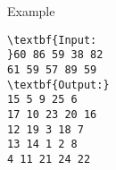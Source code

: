 Example
\begin{verbatim}
\textbf{Input:
}60 86 59 38 82 
61 59 57 89 59
\textbf{Output:}
15 5 9 25 6 
17 10 23 20 16 
12 19 3 18 7 
13 14 1 2 8 
4 11 21 24 22 
\end{verbatim}